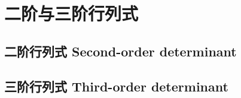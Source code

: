 \documentclass[UTF8]{ctexart}
\begin{document}
\section*{二阶与三阶行列式}
\subsection*{二阶行列式 Second-order determinant}


\subsection*{三阶行列式 Third-order determinant}
\end{document}
